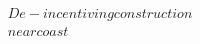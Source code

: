 \documentclass[preview]{standalone}
\begin{document}
\begin{align*}
De-incentiving construction\\near coast
\end{align*}
\end{document}
